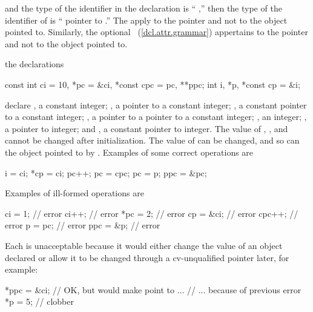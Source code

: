 and the type of the identifier in the declaration
is ``
,''
then the type of the identifier of
is `` pointer to
.''
%
%
The
apply to the pointer and not to the object pointed to.
Similarly, the optional ~(\ref{dcl.attr.grammar}) appertains to the pointer and not to the object pointed to.

\pnum
\enterexample
the declarations
%
%
\begin{codeblock}
const int ci = 10, *pc = &ci, *const cpc = pc, **ppc;
int i, *p, *const cp = &i;
\end{codeblock}

declare
,
a constant integer;
,
a pointer to a constant integer;
,
a constant pointer to a constant integer;
,
a pointer to a pointer to a constant integer;
,
an integer;
,
a pointer to integer; and
,
a constant pointer to integer.
The value of
,
,
and
cannot be changed after initialization.
The value of
can be changed, and so can the object pointed to by
.
Examples of
some correct operations are

\begin{codeblock}
i = ci;
*cp = ci;
pc++;
pc = cpc;
pc = p;
ppc = &pc;
\end{codeblock}

Examples of ill-formed operations are

\begin{codeblock}
ci = 1;             // error
ci++;               // error
*pc = 2;            // error
cp = &ci;           // error
cpc++;              // error
p = pc;             // error
ppc = &p;           // error
\end{codeblock}

Each is unacceptable because it would either change the value of an object declared
or allow it to be changed through a cv-unqualified pointer later, for example:

\begin{codeblock}
*ppc = &ci;         // OK, but would make  point to  ...
                    // ... because of previous error
*p = 5;             // clobber 
\end{codeblock}
\exitexample

